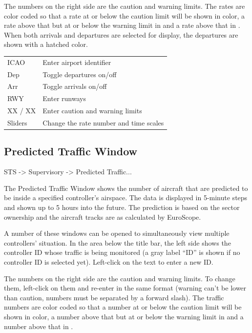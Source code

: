 \documentclass[a4paper,oneside,11pt]{memoir}
\begin{document}
\bigskip

The numbers on the right side are the caution and warning limits. The rates are color coded so that a rate at or below the caution limit will be shown in  color, a rate above that but at or below the warning limit in  and a rate above that in . When both arrivals and departures are selected for display, the departures are shown with a hatched color.

\begin{longtable}{p{2.5cm} p{10cm}}
    ICAO        & Enter airport identifier\\
    Dep         & Toggle departures on/off\\
    Arr         & Toggle arrivals on/off\\
    RWY         & Enter runways\\
    XX / XX     & Enter caution and warning limits\\
    Sliders     & Change the rate number and time scales  \\  
\end{longtable}

\subsection{Predicted Traffic Window}
\label{win:ptw}

 STS -> Supervisory -> Predicted Traffic...

\bigskip

The Predicted Traffic Window shows the number of aircraft that are predicted to be inside a specified controller’s airspace. The data is displayed in 5-minute steps and shown up to 5 hours into the future. The prediction is based on the sector ownership and the aircraft tracks are as calculated by EuroScope.

\bigskip

A number of these windows can be opened to simultaneously view multiple controllers’ situation. In the area below the title bar, the left side shows the controller ID whose traffic is being monitored (a gray label “ID” is shown if no controller ID is selected yet). Left-click on the text to enter a new ID.

\bigskip

The numbers on the right side are the caution and warning limits. To change them, left-click on them and re-enter in the same format (warning can’t be lower than caution, numbers must be separated by a forward slash). The traffic numbers are color coded so that a number at or below the caution limit will be shown in  color, a number above that but at or below the warning limit in  and a number above that in .
\end{document}
